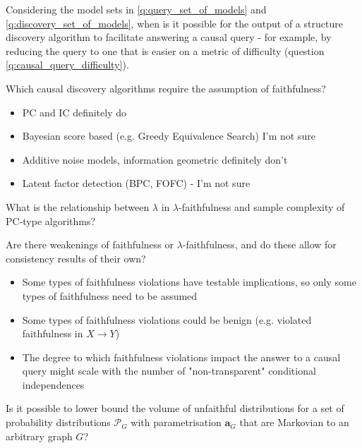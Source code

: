 \begin{question}
    Considering the model sets in \ref{q:query_set_of_models} and \ref{q:discovery_set_of_models}, when is it possible for the output of a structure discovery algorithm to facilitate answering a causal query - for example, by reducing the query to one that is easier on a metric of difficulty (question \ref{q:causal_query_difficulty}).
\end{question}

\begin{question}
    Which causal discovery algorithms require the assumption of faithfulness?
    \begin{itemize}
        \item PC and IC definitely do
        \item Bayesian score based (e.g. Greedy Equivalence Search) I'm not sure
        \item Additive noise models, information geometric definitely don't
        \item Latent factor detection (BPC, FOFC) - I'm not sure \cite{kummerfeld_causal_2016}
    \end{itemize}
\end{question}

\begin{question}
    What is the relationship between $\lambda$ in $\lambda$-faithfulness and sample complexity of PC-type algorithms?
\end{question}

\begin{question}
    Are there weakenings of faithfulness or $\lambda$-faithfulness, and do these allow for consistency results of their own?
    \begin{itemize}
        \item Some types of faithfulness violations have testable implications, so only some types of faithfulness need to be assumed \cite{ramsey_adjacency-faithfulness_2012}
        \item Some types of faithfulness violations could be benign (e.g. violated faithfulness in $X\to Y$) \cite{peters_structural_2013}
        \item The degree to which faithfulness violations impact the answer to a causal query might scale with the number of "non-transparent" conditional independences 
    \end{itemize}
\end{question}

\begin{question}\label{q:volume_unfaithful}
    Is it possible to lower bound the volume of unfaithful distributions for a set of probability distributions $\mathcal{P}_G$ with parametrisation $\mathbf{a}_G$ that are Markovian to an arbitrary graph $G$? \cite{uhler_geometry_2013}
\end{question}

